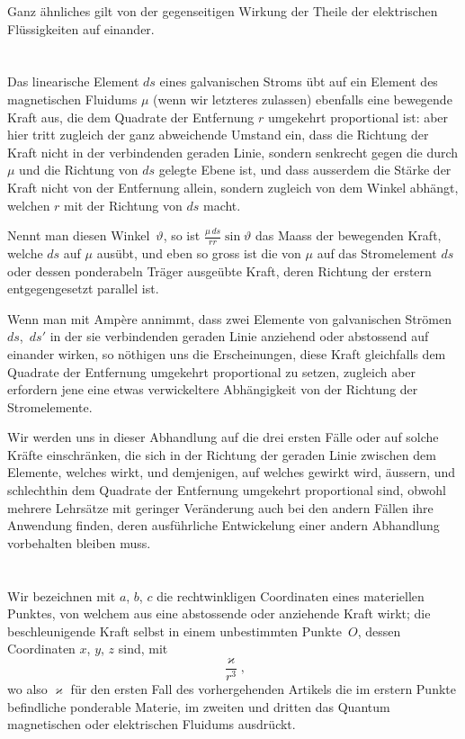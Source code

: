 \documentclass[12pt,a4paper]{article}
\begin{document}
Ganz ähnliches gilt von der gegenseitigen Wirkung der Theile der elektrischen
Flüssigkeiten auf einander.

\section{}
Das linearische Element $ds$ eines galvanischen Stroms übt auf ein Element
des magnetischen Fluidums $\mu$ (wenn wir letzteres zulassen) ebenfalls eine bewegende
Kraft aus, die dem Quadrate der Entfernung $r$ umgekehrt proportional
ist: aber hier tritt zugleich der ganz abweichende Umstand ein, dass die Richtung
der Kraft nicht in der verbindenden geraden Linie, sondern senkrecht gegen
die durch $\mu$ und die Richtung von $ds$ gelegte Ebene ist, und dass ausserdem die
Stärke der Kraft nicht von der Entfernung allein, sondern zugleich von dem Winkel
abhängt, welchen $r$ mit der Richtung von $ds$ macht.

Nennt man diesen Winkel~$\vartheta$, so ist $\tfrac{\mu\,ds}{rr}\sin\vartheta$ das Maass der bewegenden Kraft, welche $ds$ auf $\mu$
ausübt, und eben so gross ist die von $\mu$ auf das Stromelement $ds$ oder dessen
ponderabeln Träger ausgeübte Kraft, deren Richtung der erstern entgegengesetzt
parallel ist.

Wenn man mit Amp\`ere annimmt, dass zwei Elemente von galvanischen
Strömen $ds$,~$ds'$ in der sie verbindenden geraden Linie anziehend oder abstossend
auf einander wirken, so nöthigen uns die Erscheinungen, diese Kraft gleichfalls
dem Quadrate der Entfernung umgekehrt proportional zu setzen, zugleich aber
erfordern jene eine etwas verwickeltere Abhängigkeit von der Richtung der Stromelemente.

Wir werden uns in dieser Abhandlung auf die drei ersten Fälle oder auf
solche Kräfte einschränken, die sich in der Richtung der geraden Linie zwischen
dem Elemente, welches wirkt, und demjenigen, auf welches gewirkt wird, äussern,
und schlechthin dem Quadrate der Entfernung umgekehrt proportional sind, obwohl
mehrere Lehrsätze mit geringer Veränderung auch bei den andern Fällen
ihre Anwendung finden, deren ausführliche Entwickelung einer andern Abhandlung vorbehalten bleiben muss.

\section{}
Wir bezeichnen mit $a$, $b$, $c$ die rechtwinkligen Coordinaten eines materiellen
Punktes, von welchem aus eine abstossende oder anziehende Kraft wirkt;
die beschleunigende Kraft selbst in einem unbestimmten Punkte~$O$, dessen Coordinaten
$x$, $y$, $z$ sind, mit
\[
\frac{\varkappa}{r^3},
\]
wo also $\varkappa$ für den ersten Fall des vorhergehenden Artikels die im erstern Punkte
befindliche ponderable Materie, im zweiten und dritten das Quantum magnetischen
oder elektrischen Fluidums ausdrückt.
\end{document}
